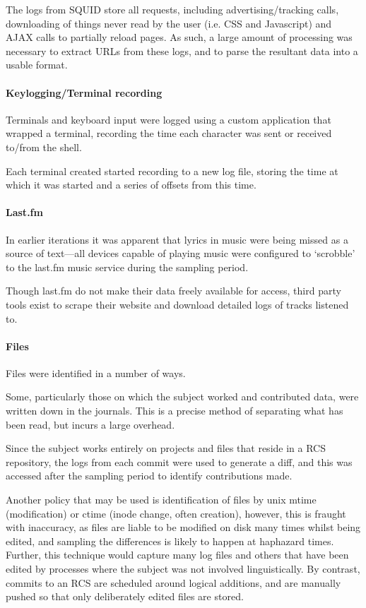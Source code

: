 The logs from SQUID store all requests, including advertising/tracking calls, downloading of things never read by the user (i.e. CSS and Javascript) and AJAX calls to partially reload pages.  As such, a large amount of processing was necessary to extract URLs from these logs, and to parse the resultant data into a usable format.

\paragraph{Keylogging/Terminal recording}
Terminals and keyboard input were logged using a custom application that wrapped a terminal, recording the time each character was sent or received to/from the shell.

Each terminal created started recording to a new log file, storing the time at which it was started and a series of offsets from this time.

\paragraph{Last.fm}
In earlier iterations it was apparent that lyrics in music were being missed as a source of text---all devices capable of playing music were configured to `scrobble' to the last.fm music service during the sampling period.

Though last.fm do not make their data freely available for access, third party tools exist to scrape their website and download detailed logs of tracks listened to.

\paragraph{Files}
Files were identified in a number of ways.

Some, particularly those on which the subject worked and contributed data, were written down in the journals.  This is a precise method of separating what has been read, but incurs a large overhead.

Since the subject works entirely on projects and files that reside in a RCS repository, the logs from each commit were used to generate a diff, and this was accessed after the sampling period to identify contributions made.

Another policy that may be used is identification of files by unix mtime (modification) or ctime (inode change, often creation), however, this is fraught with inaccuracy, as files are liable to be modified on disk many times whilst being edited, and sampling the differences is likely to happen at haphazard times.  Further, this technique would capture many log files and others that have been edited by processes where the subject was not involved linguistically.  By contrast, commits to an RCS are scheduled around logical additions, and are manually pushed so that only deliberately edited files are stored.

